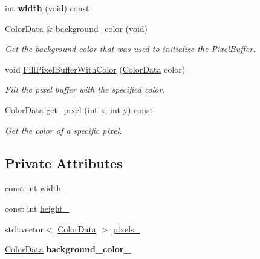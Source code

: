 \begin{DoxyCompactItemize}
\item 
int {\bfseries width} (void) const \hypertarget{classimage__tools_1_1PixelBuffer_a6143b06b081402013a5f346222b2ab5f}{}\label{classimage__tools_1_1PixelBuffer_a6143b06b081402013a5f346222b2ab5f}

\item 
\hyperlink{classimage__tools_1_1ColorData}{Color\+Data} \& \hyperlink{classimage__tools_1_1PixelBuffer_a23e28a411f6e6d553f67b9a7c4a8a33d}{background\+\_\+color} (void)
\begin{DoxyCompactList}\small\item\em Get the background color that was used to initialize the \hyperlink{classimage__tools_1_1PixelBuffer}{Pixel\+Buffer}. \end{DoxyCompactList}\item 
void \hyperlink{classimage__tools_1_1PixelBuffer_a333e7332c6b4da8f8277de7ea76fb526}{Fill\+Pixel\+Buffer\+With\+Color} (\hyperlink{classimage__tools_1_1ColorData}{Color\+Data} color)\hypertarget{classimage__tools_1_1PixelBuffer_a333e7332c6b4da8f8277de7ea76fb526}{}\label{classimage__tools_1_1PixelBuffer_a333e7332c6b4da8f8277de7ea76fb526}

\begin{DoxyCompactList}\small\item\em Fill the pixel buffer with the specified color. \end{DoxyCompactList}\item 
\hyperlink{classimage__tools_1_1ColorData}{Color\+Data} \hyperlink{classimage__tools_1_1PixelBuffer_af1a9e6d73a1a1fde15e4dbeff335c376}{get\+\_\+pixel} (int x, int y) const 
\begin{DoxyCompactList}\small\item\em Get the color of a specific pixel. \end{DoxyCompactList}\end{DoxyCompactItemize}
\subsection*{Private Attributes}
\begin{DoxyCompactItemize}
\item 
const int \hyperlink{classimage__tools_1_1PixelBuffer_ac67206a6b428c7b33bd7f90f65b8c171}{width\+\_\+}
\item 
const int \hyperlink{classimage__tools_1_1PixelBuffer_ae104466eae109324a4a0daa0bc14c980}{height\+\_\+}
\item 
std\+::vector$<$ \hyperlink{classimage__tools_1_1ColorData}{Color\+Data} $>$ \hyperlink{classimage__tools_1_1PixelBuffer_a0c52483e7e29f111acf98474105f2409}{pixels\+\_\+}
\item 
\hyperlink{classimage__tools_1_1ColorData}{Color\+Data} {\bfseries background\+\_\+color\+\_\+}\hypertarget{classimage__tools_1_1PixelBuffer_a67c70e090217b58856633ff35d499de2}{}\label{classimage__tools_1_1PixelBuffer_a67c70e090217b58856633ff35d499de2}

\end{DoxyCompactItemize}


